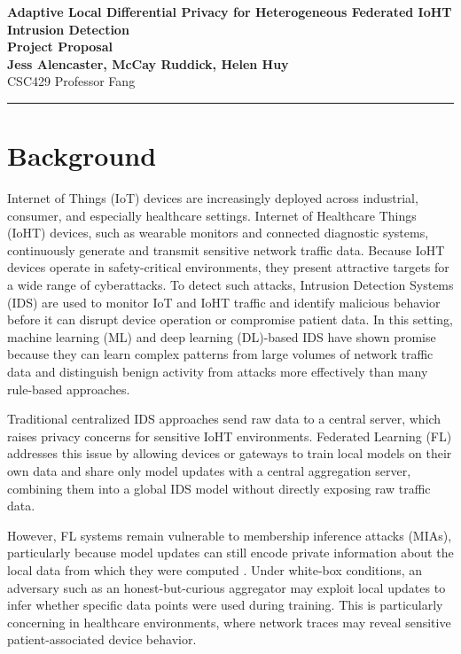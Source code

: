 \documentclass[letterpaper]{article}
\newcommand{\proposalTitle}{Adaptive Local Differential Privacy for Heterogeneous Federated IoHT Intrusion Detection}
\newcommand{\docType}{Project Proposal}
\newcommand{\classInfo}{CSC429 Professor Fang}
\newcommand{\authorNames}{\textbf{Jess Alencaster, McCay Ruddick, Helen Huy}}
\begin{document}
\begin{center}
    {\LARGE \textbf{\proposalTitle}} \\ \vspace{10pt}
    {\Large \textbf{\docType}} \\ \vspace{5pt}
    {\large \authorNames} \\ \vspace{5pt}
    {\large \classInfo}
\end{center}
\vspace{1em}
\hrule
\vspace{1.5em}


\section{Background}
Internet of Things (IoT) devices are increasingly deployed across industrial, consumer, and especially healthcare settings. Internet of Healthcare Things (IoHT) devices, such as wearable monitors and connected diagnostic systems, continuously generate and transmit sensitive network traffic data. Because IoHT devices operate in safety-critical environments, they present attractive targets for a wide range of cyberattacks. To detect such attacks, Intrusion Detection Systems (IDS) are used to monitor IoT and IoHT traffic and identify malicious behavior before it can disrupt device operation or compromise patient data. In this setting, machine learning (ML) and deep learning (DL)-based IDS have shown promise because they can learn complex patterns from large volumes of network traffic data and distinguish benign activity from attacks more effectively than many rule-based approaches.

Traditional centralized IDS approaches send raw data to a central server, which raises privacy concerns for sensitive IoHT environments. Federated Learning (FL) addresses this issue by allowing devices or gateways to train local models on their own data and share only model updates with a central aggregation server, combining them into a global IDS model without directly exposing raw traffic data.

However, FL systems remain vulnerable to membership inference attacks (MIAs), particularly because model updates can still encode private information about the local data from which they were computed \cite{nasr2019}. Under white-box conditions, an adversary such as an honest-but-curious aggregator may exploit local updates to infer whether specific data points were used during training. This is particularly concerning in healthcare environments, where network traces may reveal sensitive patient-associated device behavior.
\end{document}
